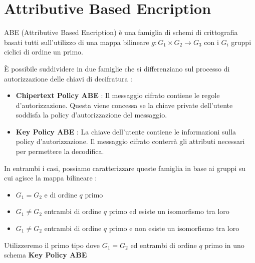 \chapter{Attributive Based Encription}

ABE (Attributive Based Encription) è una famiglia di schemi di crittografia basati tutti sull'utilizzo di una mappa bilineare $g:G_1 \times G_2 \rightarrow G_3$ con i $G_i$ gruppi ciclici di ordine un primo.

È possibile suddividere in due famiglie che si differenziano sul processo di autorizzazione delle chiavi di decifratura :
\begin{itemize}
	\item \textbf{{Chipertext Policy ABE}} :  Il messaggio cifrato contiene le regole d'autorizzazione. Questa viene concessa se la chiave private dell'utente soddisfa la policy d'autorizzazione del messaggio.
	\item \textbf{Key Policy ABE} : La chiave dell'utente contiene le informazioni sulla policy d'autorizzazione. Il messaggio cifrato conterrà gli attributi necessari per permettere la decodifica.
\end{itemize}

In entrambi i casi, possiamo caratterizzare\cite{maya3} queste famiglia in base ai gruppi su cui agisce la mappa bilineare :
\begin{itemize}
	\item $G_1 = G_2$ e di ordine $q$ primo
	\item $G_1 \neq G_2$ entrambi di ordine $q$ primo ed esiste un isomorfismo tra loro
	\item $G_1 \neq G_2$ entrambi di ordine $q$ primo e non esiste un isomorfismo tra loro
\end{itemize}	

Utilizzeremo il primo tipo dove $G_1 = G_2$ ed entrambi di ordine $q$ primo in uno schema \textbf{Key Policy ABE}








